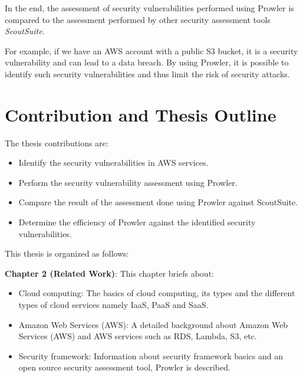 \par In the end, the assessment of security vulnerabilities performed using Prowler is compared to the assessment performed by other security assessment tools \textit{ScoutSuite}.

\par For example, if we have an AWS account with a public S3 bucket, it is a security vulnerability and can lead to a data breach. By using Prowler, it is possible to identify such security vulnerabilities and thus limit the risk of security attacks.

\section{Contribution and Thesis Outline}
\par The thesis contributions are:
\begin{itemize}
    \item Identify the security vulnerabilities in AWS services.
\end{itemize}
\begin{itemize}
    \item Perform the security vulnerability assessment using Prowler.
\end{itemize}
\begin{itemize}
    \item Compare the result of the assessment done using Prowler against ScoutSuite.
\end{itemize}
\begin{itemize}
    \item Determine the efficiency of Prowler against the identified security vulnerabilities.
\end{itemize}

\par This thesis is organized as follows:
\par \textbf{Chapter 2 (Related Work)}: This chapter briefs about:
\begin{itemize}
    \item Cloud computing: The basics of cloud computing, its types and the different types of cloud services namely IaaS, PaaS and SaaS.
\end{itemize}
\begin{itemize}
    \item Amazon Web Services (AWS): A detailed
    background about Amazon Web Services (AWS) and AWS
    services such as RDS, Lambda, S3, etc.
\end{itemize}
\begin{itemize}
    \item Security framework: Information about security framework basics and an open source security assessment tool, Prowler is described.
\end{itemize}

